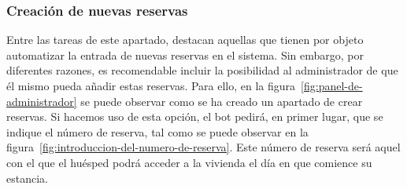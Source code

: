 \subsubsection{Creación de nuevas reservas}

Entre las tareas de este apartado, destacan aquellas que tienen por objeto automatizar la entrada de nuevas reservas en el sistema. Sin embargo, por diferentes razones, es recomendable incluir la posibilidad al administrador de que él mismo pueda añadir estas reservas. Para ello, en la figura~\ref{fig:panel-de-administrador} se puede observar como se ha creado un apartado de crear reservas. Si hacemos uso de esta opción, el bot pedirá, en primer lugar, que se indique el número de reserva, tal como se puede observar en la figura~\ref{fig:introduccion-del-numero-de-reserva}. Este número de reserva será aquel con el que el huésped podrá acceder a la vivienda el día en que comience su estancia.
